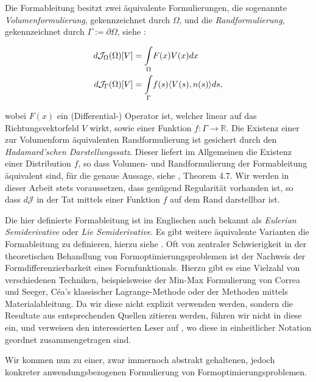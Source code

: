 Die Formableitung besitzt zwei äquivalente Formulierungen, die sogenannte \textit{Volumenformulierung}, gekennzeichnet durch $\Omega$, und die \textit{Randformulierung}, gekennzeichnet durch $\Gamma := \partial \Omega$, siehe \cite{bfgs2}:

\begin{equation}
\label{VolumenRandformulierung}
\begin{aligned}
	d\mathcal{J}_\Omega(\Omega)[V] &= \underset{\Omega}{\int}F(x)V(x)dx\\
	\vspace{0.5cm}
	d\mathcal{J}_\Gamma(\Omega)[V] &= \underset{\Gamma}{\int}f(s)\langle V(s),n(s)\rangle ds,
\end{aligned}
\end{equation}

wobei $F(x)$ ein (Differential-) Operator ist, welcher linear auf das Richtungsvektorfeld $V$ wirkt, sowie einer Funktion $f: \Gamma \rightarrow \mathbb{R}$. Die Existenz einer zur Volumenform äquivalenten Randformulierung ist gesichert durch den \textit{Hadamard'schen Darstellungssatz}. Dieser liefert im Allgemeinen die Existenz einer Distribution $f$, so dass Volumen- und Randformulierung der  Formableitung äquivalent sind, für die genaue Aussage, siehe \cite{shape_space}, Theorem 4.7. Wir werden in dieser Arbeit stets voraussetzen, dass genügend Regularität vorhanden ist, so dass $d\mathcal{J}$ in der Tat mittels einer Funktion $f$ auf dem Rand darstellbar ist.

Die hier definierte Formableitung ist im Englischen auch bekannt als \textit{Eulerian Semiderivative} oder \textit{Lie Semiderivative}. Es gibt weitere äquivalente Varianten die Formableitung zu definieren, hierzu siehe \cite{Shape_diff}. Oft von zentraler Schwierigkeit in der theoretischen Behandlung von Formoptimierungsproblemen ist der Nachweis der Formdifferenzierbarkeit eines Formfunktionals. Hierzu gibt es eine Vielzahl von verschiedenen Techniken, beispielsweise der Min-Max Formulierung von Correa und Seeger, Céa's klassischer Lagrange-Methode oder der Methoden mittels Materialableitung. Da wir diese nicht explizit verwenden werden, sondern die Resultate aus entsprechenden Quellen zitieren werden, führen wir nicht in diese ein, und verweisen den interessierten Leser auf \cite{Shape_diff}, wo diese in einheitlicher Notation geordnet zusammengetragen sind.

Wir kommen nun zu einer, zwar immernoch abstrakt gehaltenen, jedoch konkreter anwendungsbezogenen Formulierung von Formoptimierungsproblemen.

